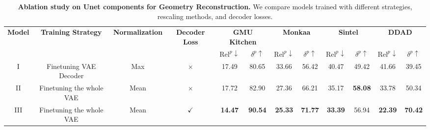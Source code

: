 \begin{table}[t]
\centering
\renewcommand{\arraystretch}{1.2}
\caption{\textbf{Ablation study on Unet components for Geometry Reconstruction.} 
We compare models trained with different strategies, rescaling methods, and decoder losses.}
\label{tab:more_ablation_unet}
\begin{adjustbox}{width=\textwidth}
\begin{tabular}{c|ccc|cc|cc|cc|cc}
\toprule
\multirow{2}{*}{\textbf{Model}} & \multirow{2}{*}{\textbf{Training Strategy}} & \multirow{2}{*}{\textbf{Normalization}} & \multirow{2}{*}{\textbf{Decoder Loss}} & 
\multicolumn{2}{c|}{\textbf{GMU Kitchen}} & 
\multicolumn{2}{c|}{\textbf{Monkaa}} & 
\multicolumn{2}{c|}{\textbf{Sintel}} & 
\multicolumn{2}{c}{\textbf{DDAD}} \\
 & & & & 
$\text{Rel}^{p}\!\downarrow$ & $\delta^{p}\!\uparrow$ &
$\text{Rel}^{p}\!\downarrow$ & $\delta^{p}\!\uparrow$ &
$\text{Rel}^{p}\!\downarrow$ & $\delta^{p}\!\uparrow$ &
$\text{Rel}^{p}\!\downarrow$ & $\delta^{p}\!\uparrow$  \\
\midrule
I & Finetuning VAE Decoder & Max & \(\times\) & 17.49 & 80.65 & 33.66 & 56.42 & 40.47 & 49.42 & 41.66 & 39.45 \\
II & Finetuning the whole VAE & Mean & \(\times\) & 17.72 & 82.90 & 27.36 & 66.21 & 35.17 & \textbf{58.08} & 33.78 & 50.34 \\
III & Finetuning the whole VAE & Mean & \(\checkmark\) & \textbf{14.47} & \textbf{90.54} & \textbf{25.33} & \textbf{71.77} & \textbf{33.39} & 56.94  & \textbf{22.39} & \textbf{70.42} \\
\bottomrule
\end{tabular}
\end{adjustbox}
\end{table}

